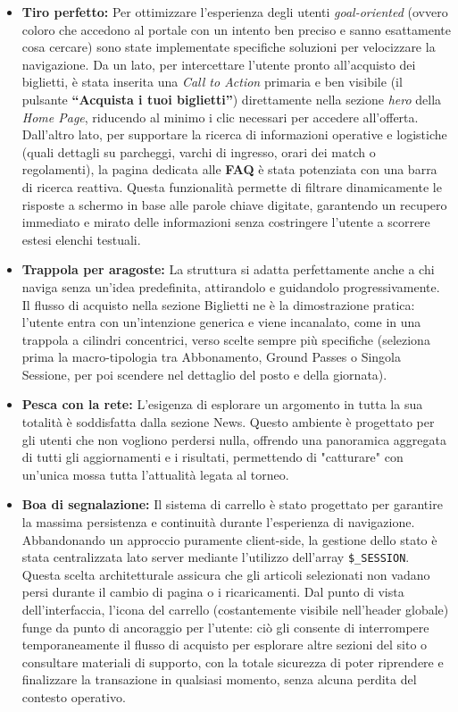 \documentclass[11pt,a4paper]{article}
\begin{document}
\begin{itemize}
    \item \textbf{Tiro perfetto:} Per ottimizzare l'esperienza degli utenti \textit{goal-oriented} (ovvero coloro che accedono al portale con un intento ben preciso e sanno esattamente cosa cercare) sono state implementate specifiche soluzioni per velocizzare la navigazione. Da un lato, per intercettare l'utente pronto all'acquisto dei biglietti, è stata inserita una \textit{Call to Action} primaria e ben visibile (il pulsante \textbf{``Acquista i tuoi biglietti''}) direttamente nella sezione \textit{hero} della \textit{Home Page}, riducendo al minimo i clic necessari per accedere all'offerta. Dall'altro lato, per supportare la ricerca di informazioni operative e logistiche (quali dettagli su parcheggi, varchi di ingresso, orari dei match o regolamenti), la pagina dedicata alle \textbf{FAQ} è stata potenziata con una barra di ricerca reattiva. Questa funzionalità permette di filtrare dinamicamente le risposte a schermo in base alle parole chiave digitate, garantendo un recupero immediato e mirato delle informazioni senza costringere l'utente a scorrere estesi elenchi testuali.
    
    \item \textbf{Trappola per aragoste:} La struttura si adatta perfettamente anche a chi naviga senza un'idea predefinita, attirandolo e guidandolo progressivamente. Il flusso di acquisto nella sezione Biglietti ne è la dimostrazione pratica: l'utente entra con un'intenzione generica e viene incanalato, come in una trappola a cilindri concentrici, verso scelte sempre più specifiche (seleziona prima la macro-tipologia tra Abbonamento, Ground Passes o Singola Sessione, per poi scendere nel dettaglio del posto e della giornata).
    
    \item \textbf{Pesca con la rete:} L'esigenza di esplorare un argomento in tutta la sua totalità è soddisfatta dalla sezione News. Questo ambiente è progettato per gli utenti che non vogliono perdersi nulla, offrendo una panoramica aggregata di tutti gli aggiornamenti e i risultati, permettendo di "catturare" con un'unica mossa tutta l'attualità legata al torneo.
    
    \item \textbf{Boa di segnalazione:} Il sistema di carrello è stato progettato per garantire la massima persistenza e continuità durante l'esperienza di navigazione. Abbandonando un approccio puramente client-side, la gestione dello stato è stata centralizzata lato server mediante l'utilizzo dell'array \texttt{\$\_SESSION}. Questa scelta architetturale assicura che gli articoli selezionati non vadano persi durante il cambio di pagina o i ricaricamenti. Dal punto di vista dell'interfaccia, l'icona del carrello (costantemente visibile nell'header globale) funge da punto di ancoraggio per l'utente: ciò gli consente di interrompere temporaneamente il flusso di acquisto per esplorare altre sezioni del sito o consultare materiali di supporto, con la totale sicurezza di poter riprendere e finalizzare la transazione in qualsiasi momento, senza alcuna perdita del contesto operativo.
\end{itemize}
\end{document}
